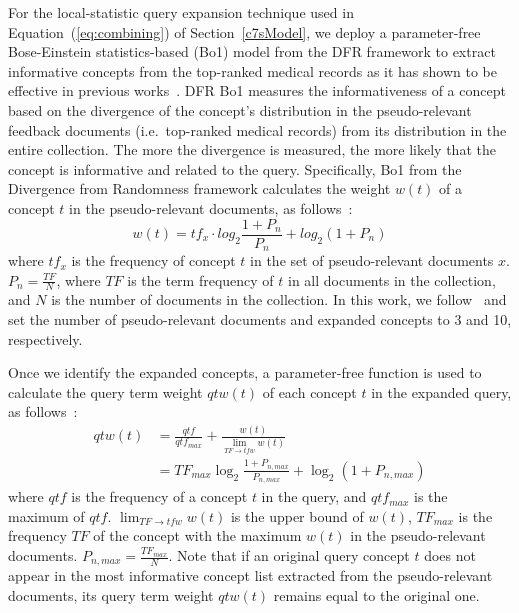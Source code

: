 \documentclass[1p]{elsarticle}
\begin{document}
For the local-statistic query expansion technique used in Equation~(\ref{eq:combining}) of Section~\ref{c7sModel}, we deploy a parameter-free Bose-Einstein statistics-based (Bo1) model from the DFR framework to extract informative concepts from the top-ranked medical records as it has shown to be effective in previous works~\cite{limsopatham2011trec,limsopatham2013ecir-b}. DFR Bo1 measures the informativeness of a concept based on the divergence of the concept's distribution in the pseudo-relevant feedback documents (i.e.\ top-ranked medical records) from its distribution in the entire collection. The more the divergence is measured, the more likely that the concept is informative and related to the query. Specifically, Bo1 from the Divergence from Randomness framework calculates the weight $w(t)$ of a concept $t$ in the pseudo-relevant documents, as follows~\cite{amati2003thesis}:
\begin{equation}
w(t) = tf_x \cdot log_2 \frac {1+P_n}{P_n} + log_2 (1+P_n)
\end{equation}
where $tf_x$ is the frequency of concept $t$ in the set of pseudo-relevant documents $x$. $P_n = \frac{TF}{N}$, where $TF$ is the term frequency of $t$ in all documents in the collection, and $N$ is the number of documents in the collection. In this work, we follow~\cite{amati2003thesis} and set the number of pseudo-relevant documents and expanded concepts to 3 and 10, respectively.

Once we identify the expanded concepts, a parameter-free function is used to calculate the query term weight $qtw(t)$ of each concept $t$ in the expanded query, as follows~\cite{amati2003thesis}:
\begin{align}
qtw(t) &= \frac{qtf}{qtf_{max}} + \frac{w(t)}{\lim_{TF \rightarrow tfw} w(t)} \\ \nonumber
&= TF_{max} \log_2 \frac{1+P_{n,max}}{P_{n,max}} + \log_2 (1+P_{n,max})
\end{align}\label{eq:c2sBo12}
where $qtf$ is the frequency of a concept $t$ in the query, and $qtf_{max}$ is the maximum of $qtf$. $\lim_{TF \rightarrow tfw} w(t)$ is the upper bound of $w(t)$, $TF_{max}$ is the frequency $TF$ of the concept with the maximum $w(t)$ in the pseudo-relevant documents. $P_{n,max} = \frac{TF_{max}}{N}$. Note that if an original query concept $t$ does not appear in the most informative concept list extracted from the pseudo-relevant documents, its query term weight $qtw(t)$ remains equal to the original one.
\end{document}
